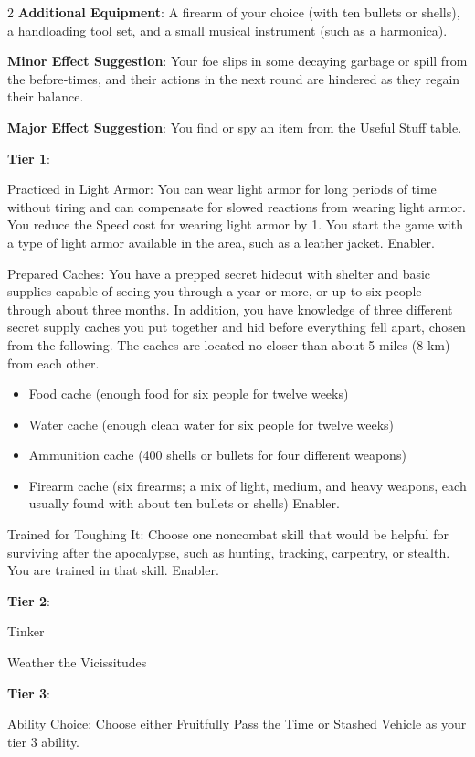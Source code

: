 \begin{multicols}{2}
\textbf{Additional Equipment}: A firearm of your choice (with ten bullets or shells), a handloading tool set, and a small musical instrument (such as a harmonica).

\textbf{Minor Effect Suggestion}: Your foe slips in some decaying garbage or spill from the before‑times, and their actions in the next round are hindered as they regain their balance.

\textbf{Major Effect Suggestion}: You find or spy an item from the Useful Stuff table.

\textbf{Tier 1}:

Practiced in Light Armor: You can wear light armor for long periods of time without tiring and can compensate for slowed reactions from wearing light armor. You reduce the Speed cost for wearing light armor by 1. You start the game with a type of light armor available in the area, such as a leather jacket. Enabler.

Prepared Caches: You have a prepped secret hideout with shelter and basic supplies capable of seeing you through a year or more, or up to six people through about three months. In addition, you have knowledge of three different secret supply caches you put together and hid before everything fell apart, chosen from the following. The caches are located no closer than about 5 miles (8 km) from each other.

\begin{itemize}
\item Food cache (enough food for six people for twelve weeks)
\item Water cache (enough clean water for six people for twelve weeks)
\item Ammunition cache (400 shells or bullets for four different weapons)
\item Firearm cache (six firearms; a mix of light, medium, and heavy weapons, each usually found with about ten bullets or shells)
Enabler.
\end{itemize}

Trained for Toughing It: Choose one noncombat skill that would be helpful for surviving after the apocalypse, such as hunting, tracking, carpentry, or stealth. You are trained in that skill. Enabler.

\textbf{Tier 2}:

Tinker

Weather the Vicissitudes

\textbf{Tier 3}:

Ability Choice: Choose either Fruitfully Pass the Time or Stashed Vehicle as your tier 3 ability.


\end{multicols}
